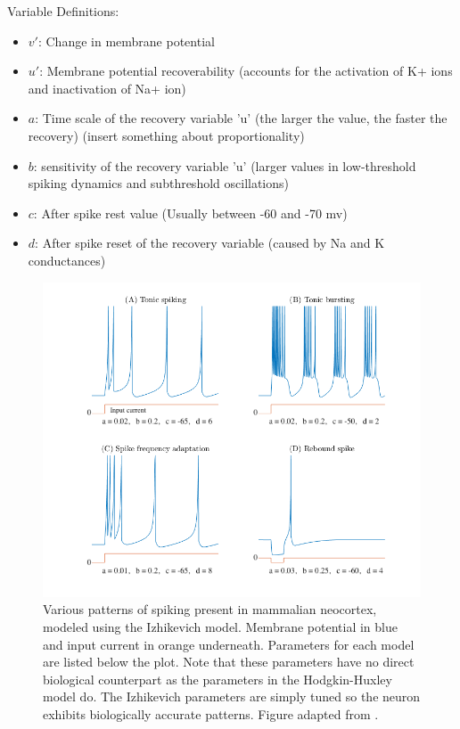 \documentclass[11pt]{article}
\begin{document}
Variable Definitions:
\begin{itemize}
    \item $v'$: Change in membrane potential
    \item $u'$: Membrane potential recoverability (accounts for the activation of K+ ions and inactivation of Na+ ion)
    \item $a$: Time scale of the recovery variable 'u' (the larger the value, the faster the recovery) (insert something about proportionality)
    \item $b$: sensitivity of the recovery variable 'u' (larger values in low-threshold spiking dynamics and subthreshold oscillations)
    \item $c$: After spike rest value (Usually between -60 and -70 mv)
    \item $d$: After spike reset of the recovery variable (caused by Na and K conductances)
\end{itemize}

\begin{figure}[H]
    \centering
    \includegraphics[width=6in]{figures/izhikevich_spike_patterns.png}
    \caption{Various patterns of spiking present in mammalian neocortex, modeled using the Izhikevich model. Membrane potential in blue and input current in orange underneath. Parameters for each model are listed below the plot. Note that these parameters have no direct biological counterpart as the parameters in the Hodgkin-Huxley model do. The Izhikevich parameters are simply tuned so the neuron exhibits biologically accurate patterns. Figure adapted from \cite{izhikevich_which_model}.}
    \label{fig:izhikevich_spike_patterns}
\end{figure}
\end{document}

